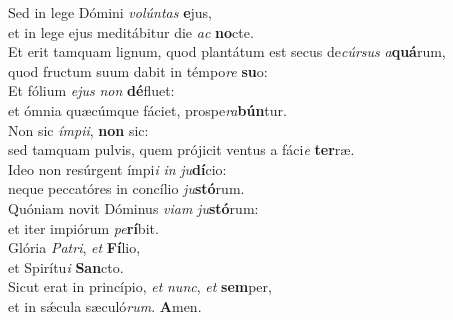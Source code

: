 \evenverse Sed in lege Dómini \textit{vo}\textit{lún}\textit{tas} \textbf{e}jus,~\*\\
\evenverse et in lege ejus meditábitur die \textit{ac} \textbf{no}cte.\\
\oddverse Et erit tamquam lignum, quod plantátum est secus de\textit{cúr}\textit{sus} \textit{a}\textbf{quá}rum,~\*\\
\oddverse quod fructum suum dabit in témpo\textit{re} \textbf{su}o:\\
\evenverse Et fólium \textit{e}\textit{jus} \textit{non} \textbf{dé}fluet:~\*\\
\evenverse et ómnia quæcúmque fáciet, prospe\textit{ra}\textbf{bún}tur.\\
\oddverse Non sic \textit{ím}\textit{pi}\textit{i}, \textbf{non} sic:~\*\\
\oddverse sed tamquam pulvis, quem prójicit ventus a fáci\textit{e} \textbf{ter}ræ.\\
\evenverse Ideo non resúrgent ímpi\textit{i} \textit{in} \textit{ju}\textbf{dí}cio:~\*\\
\evenverse neque peccatóres in concílio \textit{ju}\textbf{stó}rum.\\
\oddverse Quóniam novit Dóminus \textit{vi}\textit{am} \textit{ju}\textbf{stó}rum:~\*\\
\oddverse et iter impiórum \textit{pe}\textbf{rí}bit.\\
\evenverse Glória \textit{Pa}\textit{tri}, \textit{et} \textbf{Fí}lio,~\*\\
\evenverse et Spirítu\textit{i} \textbf{San}cto.\\
\oddverse Sicut erat in princípio, \textit{et} \textit{nunc}, \textit{et} \textbf{sem}per,~\*\\
\oddverse et in sǽcula sæculó\textit{rum}. \textbf{A}men.\\
